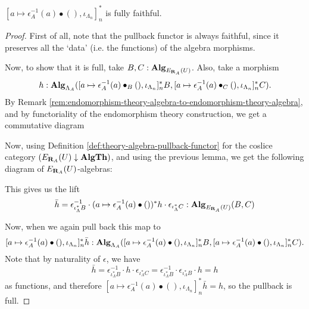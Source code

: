 \begin{lemma}\label{lem:pullback-fully-faithful}
  $ [a \mapsto \epsilon_A^{-1}(a) \bullet (), \iota_{\Lambda_n}]_n^* $ is fully faithful.
\end{lemma}
\begin{proof}
  First of all, note that the pullback functor is always faithful, since it preserves all the `data' (i.e. the functions) of the algebra morphisms.

  Now, to show that it is full, take $ B, C: \mathbf{Alg}_{E_{\mathbf{R}_A}(U)} $. Also, take a morphism
  \[ h : \mathbf{Alg}_{\Lambda_A}([a \mapsto \epsilon_A^{-1}(a) \bullet_B (), \iota_{\Lambda_n}]_n^* B, [a \mapsto \epsilon_A^{-1}(a) \bullet_C (), \iota_{\Lambda_n}]_n^* C). \]
  By Remark \ref{rem:endomorphism-theory-algebra-to-endomorphism-theory-algebra}, and by functoriality of the endomorphism theory construction, we get a commutative diagram
  \begin{center}
  \end{center}
  Now, using Definition \ref{def:theory-algebra-pullback-functor} for the coslice category $ (E_{\mathbf{R}_A}(U) \downarrow \mathbf{AlgTh}) $, and using the previous lemma, we get the following diagram of $ E_{\mathbf{R}_A}(U) $-algebras:
  \begin{center}
  \end{center}
  This gives us the lift
  \[ \bar h = \epsilon_{\iota_\Lambda^* B}^{-1} \cdot (a \mapsto \epsilon_A^{-1}(a) \bullet ())^* h \cdot \epsilon_{\iota_\Lambda^* C} : \mathbf{Alg}_{E_{\mathbf{R}_A}(U)}(B, C) \]

  Now, when we again pull back this map to
  \[ [a \mapsto \epsilon_A^{-1}(a) \bullet (), \iota_{\Lambda_n}]_n^* \bar h : \mathbf{Alg}_{\Lambda_A}([a \mapsto \epsilon_A^{-1}(a) \bullet (), \iota_{\Lambda_n}]_n^* B, [a \mapsto \epsilon_A^{-1}(a) \bullet (), \iota_{\Lambda_n}]_n^* C). \]
  Note that by naturality of $ \epsilon $, we have
  \[ \bar h = \epsilon_{\iota_\Lambda^* B}^{-1} \cdot h \cdot \epsilon_{\iota_\Lambda^* C} = \epsilon_{\iota_\Lambda^* B}^{-1} \cdot \epsilon_{\iota_\Lambda^* B} \cdot h = h \]
  as functions, and therefore $ [a \mapsto \epsilon_A^{-1}(a) \bullet (), \iota_{\Lambda_n}]_n^* \bar h = h $, so the pullback is full.
\end{proof}


